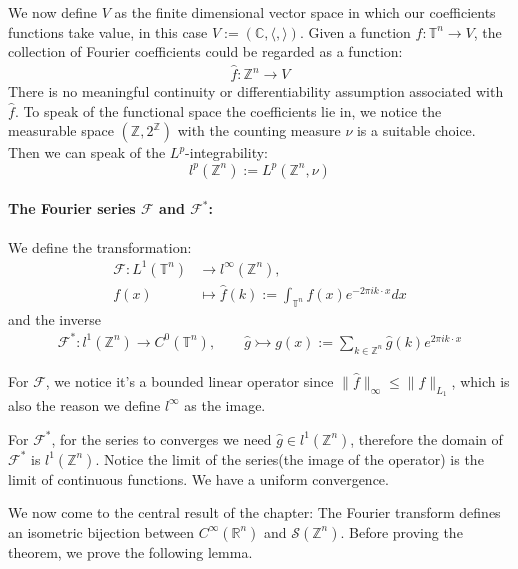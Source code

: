 We now define $V$ as the finite dimensional vector space in which our coefficients functions take value, in this case $V:= ( \mathbb{C}, \langle , \rangle )$. 
Given a function $f : \mathbb{T}^n \rightarrow V$,  the collection of Fourier coefficients could be regarded as a function:
\begin{align*}
	\hat{f}: \mathbb{Z}^n \rightarrow V
\end{align*}
There is no meaningful continuity or differentiability assumption associated with $\hat{f}$. To speak of the functional space the coefficients lie in, we notice the measurable space $(\mathbb{Z}, 2^{\mathbb{Z}})$ with the counting measure $\nu$ is a suitable choice. Then we can speak of the $L^p$-integrability:
\begin{equation}
	l^p(\mathbb{Z}^n):= L^p(\mathbb{Z}^n, \nu)
\end{equation}



\paragraph{The Fourier series $\mathcal{F}$ and $\mathcal{F}^*$:}
We define the transformation:
\begin{align*}
	\mathcal{F}: L^1(\mathbb{T}^n) &\rightarrow l^\infty(\mathbb{Z}^n), \\
	f(x) &\mapsto \hat{f}(k) := \int_{\mathbb{T}^n} f(x) e^{-2 \pi i k \cdot x} dx
\end{align*}
and the inverse
\begin{align*}
	\mathcal{F}^* : l^1(\mathbb{Z}^n) \rightarrow C^0(\mathbb{T}^n),
	\qquad \hat{g} \rightarrowtail g(x):=  \sum_{ k \in \mathbb{Z}^n} \hat{g}(k) e^{2\pi i k \cdot x} 
\end{align*}

For $\mathcal{F}$, we notice it's a bounded linear operator since $\|\hat{f}\|_\infty \leq \|f\|_{L_1}$, which is also the reason we define $l^\infty$ as the image.\par 
For $\mathcal{F}^*$, for the series to converges we need $\hat{g} \in l^1(\mathbb{Z}^n)$, therefore the domain of $\mathcal{F}^*$ is $l^1(\mathbb{Z}^n)$. Notice the limit of the series(the image of the operator) is the limit of continuous functions. We have a uniform convergence. \par 
We now come to the central result of the chapter: The Fourier transform defines an isometric bijection between $C^\infty(\mathbb{R}^n)$ and $\mathcal{S}(\mathbb{Z}^n)$. Before proving the theorem, we prove the following lemma.

